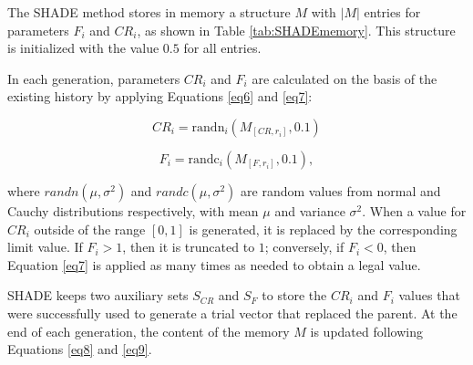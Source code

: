 \documentclass[review]{elsarticle}
\begin{document}
The SHADE method stores in memory a structure $M$ with $|M|$ entries for parameters $F_i$ and $CR_i$, as shown in Table \ref{tab:SHADEmemory}. This structure is initialized with the value $0.5$ for all entries.

\begin{table}[!h]
	\centering
	\setlength{\tabcolsep}{13pt}
	\caption{Historical memory $M_{CR}$, $M_{F}$ used by SHADE \cite{tanabe2013success}}
	\label{tab:SHADEmemory}
\end{table}

In each generation, parameters $CR_i$ and $F_i$ are calculated on the basis of the existing history by applying Equations \eqref{eq6} and \eqref{eq7}:

\begin{equation}
CR_i = \text{randn}_i(M_{[CR,r_i]}, 0.1)
\label{eq6}
\end{equation}

\begin{equation}
F_i = \text{randc}_i(M_{[F,r_i]}, 0.1),
\label{eq7}
\end{equation}

\noindent where $randn(\mu, \sigma^2)$ and $randc(\mu, \sigma^2)$ are random values from normal and Cauchy distributions respectively, with mean $\mu$ and variance $\sigma^2$. When a value for $CR_i$ outside of the range $[0,1]$ is generated, it is replaced by the corresponding limit value. If $F_i > 1$, then it is truncated to $1$; conversely, if $F_i < 0$, then Equation \eqref{eq7} is applied as many times as needed to obtain a legal value.

SHADE keeps two auxiliary sets $S_{CR}$ and $S_F$ to store the $CR_i$ and $F_i$ values that were successfully used to generate a trial vector that replaced the parent. At the end of each generation, the content of the memory $M$ is updated following Equations \eqref{eq8} and \eqref{eq9}.
\end{document}
